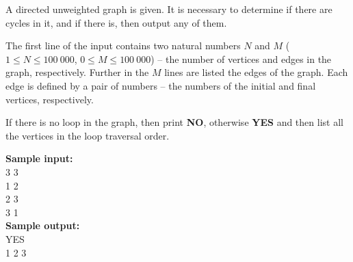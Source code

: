 \documentclass[a4paper]{article}
\begin{document}
A directed unweighted graph is given. It is necessary to determine if there are cycles in it, and if there is, then output any of them.

The first line of the input contains two natural numbers $N$ and $M$ ($1 \le N \le 100 \ 000$, $0 \le M \le 100 \ 000$) -- the number of vertices and edges in the graph, respectively. Further in the $M$ lines are listed the edges of the graph. Each edge is defined by a pair of numbers -- the numbers of the initial and final vertices, respectively.

If there is no loop in the graph, then print \textbf{NO}, otherwise \textbf{YES} and then list all the vertices in the loop traversal order.

\SPACE

\noindent \textbf{Sample input:}\\
3 3\\
1 2\\
2 3\\
3 1\\


\noindent \textbf{Sample output:}\\
YES\\
1 2 3\\
\end{document}
